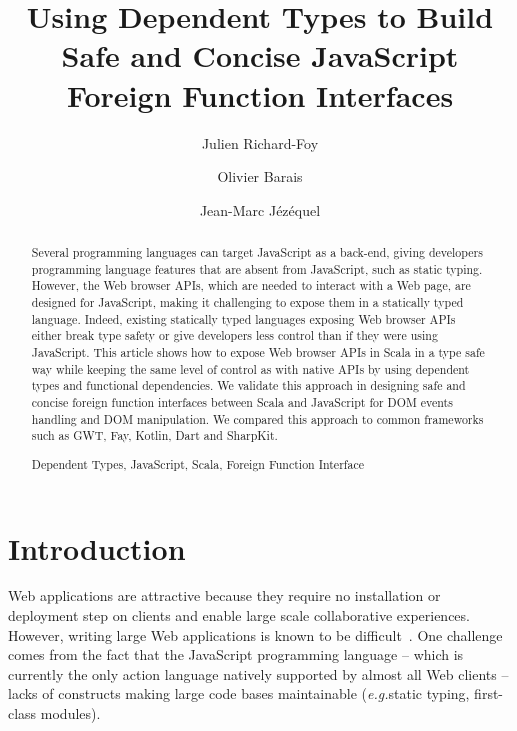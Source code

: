 \documentclass[runningheads,a4paper]{llncs}
\newcommand{\keywords}[1]{\par\addvspace\baselineskip
\noindent\keywordname\enspace\ignorespaces#1}
\newcommand{\eg}{\emph{e.g.}}
\begin{document}
\mainmatter

\title{Using Dependent Types to Build Safe and Concise JavaScript Foreign Function Interfaces}

\author{Julien Richard-Foy \and Olivier Barais\and Jean-Marc Jézéquel}


\maketitle


\begin{abstract}
Several programming languages can target JavaScript as a back-end, giving developers programming language features
that are absent from JavaScript, such as static typing. However, the Web browser APIs, which are needed to interact
with a Web page, are designed for JavaScript, making it challenging to expose them in a statically typed language.
Indeed, existing statically typed languages exposing Web browser APIs either break type safety or give developers
less control than if they were using JavaScript. This article shows how to expose Web browser APIs in Scala in a
type safe way while keeping the same level of control as with native APIs by using dependent types and functional
dependencies. We validate this approach in designing safe and concise foreign function interfaces between Scala and
JavaScript for DOM events handling and DOM manipulation. We compared this approach to common frameworks such as GWT,
Fay, Kotlin, Dart and SharpKit.
\keywords{Dependent Types, JavaScript, Scala, Foreign Function Interface}
\end{abstract}


\section{Introduction}

Web applications are attractive because they require no installation or deployment step on clients and enable large
scale collaborative experiences. However, writing large Web applications is known to be
difficult~\cite{Mikkonen08_SpaghettiJs,Preciado05_RIAMethodologyNecessity}. One challenge comes from the fact that
the JavaScript programming language -- which is currently the only action language natively supported by almost all
Web clients -- lacks of constructs making large code bases maintainable (\eg static typing, first-class modules).
\end{document}
